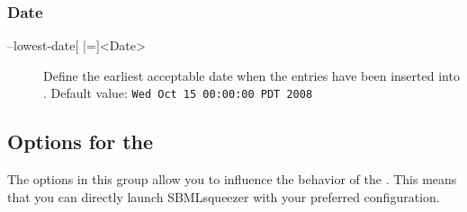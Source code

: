 \subsubsection{Date}
\begin{description}
\item[--lowest-date{[} |={]}<Date>]
  Define the earliest acceptable date when the entries have been
  inserted into \SABIO.
  Default value: \texttt{Wed Oct 15 00:00:00 PDT 2008}
\end{description}


\subsection{Options for the }

The options in this group allow you to influence the behavior of the \GUI.
This means that you can directly launch SBMLsqueezer with your preferred configuration.

